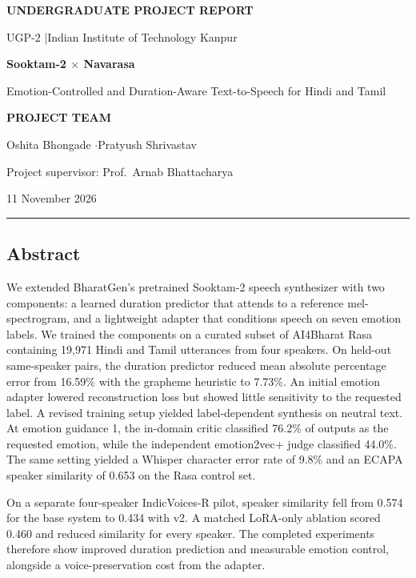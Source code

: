 \documentclass[11pt,a4paper]{article}
\begin{document}
\thispagestyle{empty}
{\color{accent}\large\sffamily\bfseries UNDERGRADUATE PROJECT REPORT}\par
{\color{muted}\sffamily UGP-2 \enspace|\enspace Indian Institute of Technology Kanpur}\par
\vspace{12mm}
{\color{ink}\Huge\bfseries Sooktam-2 \(\times\) Navarasa\par}
\vspace{2mm}
{\color{accent}\LARGE Emotion-Controlled and Duration-Aware Text-to-Speech for Hindi and Tamil\par}
\vspace{8mm}
{\small\sffamily\bfseries\color{accent}PROJECT TEAM}\par
{\Large Oshita Bhongade \quad\(\cdot\)\quad Pratyush Shrivastav}\par
{\color{muted}Project supervisor: Prof.\ Arnab Bhattacharya}\par
{\color{muted}11 November 2026}\par
\vspace{5mm}
{\color{accent}\rule{\linewidth}{0.7pt}}\par

\subsection*{Abstract}
We extended BharatGen's pretrained Sooktam-2 speech synthesizer with two components: a learned duration predictor that attends to a reference mel-spectrogram, and a lightweight adapter that conditions speech on seven emotion labels. We trained the components on a curated subset of AI4Bharat Rasa containing 19,971 Hindi and Tamil utterances from four speakers. On held-out same-speaker pairs, the duration predictor reduced mean absolute percentage error from 16.59\% with the grapheme heuristic to 7.73\%. An initial emotion adapter lowered reconstruction loss but showed little sensitivity to the requested label. A revised training setup yielded label-dependent synthesis on neutral text. At emotion guidance 1, the in-domain critic classified 76.2\% of outputs as the requested emotion, while the independent emotion2vec+ judge classified 44.0\%. The same setting yielded a Whisper character error rate of 9.8\% and an ECAPA speaker similarity of 0.653 on the Rasa control set.

On a separate four-speaker IndicVoices-R pilot, speaker similarity fell from 0.574 for the base system to 0.434 with v2. A matched LoRA-only ablation scored 0.460 and reduced similarity for every speaker. The completed experiments therefore show improved duration prediction and measurable emotion control, alongside a voice-preservation cost from the adapter.
\end{document}
